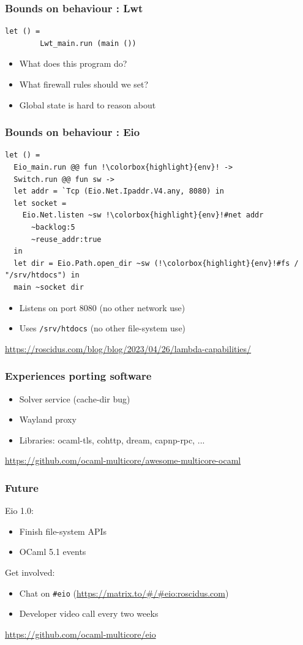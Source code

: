 \documentclass{beamer}
\begin{document}
\begin{frame}[fragile]
	\frametitle{Bounds on behaviour : Lwt}

	\begin{lstlisting}[style=ocaml]
	      let () =
		Lwt_main.run (main ())
	\end{lstlisting}

	\begin{itemize}
		\item What does this program do?
		\item What firewall rules should we set?
		\item Global state is hard to reason about
	\end{itemize}
\end{frame}

\begin{frame}[fragile]
	\frametitle{Bounds on behaviour : Eio}

	\setlength\fboxsep{1.2pt}
	\begin{lstlisting}[style=ocaml,escapechar=!]
let () =
  Eio_main.run @@ fun !\colorbox{highlight}{env}! ->
  Switch.run @@ fun sw ->
  let addr = `Tcp (Eio.Net.Ipaddr.V4.any, 8080) in
  let socket =
    Eio.Net.listen ~sw !\colorbox{highlight}{env}!#net addr
      ~backlog:5
      ~reuse_addr:true
  in
  let dir = Eio.Path.open_dir ~sw (!\colorbox{highlight}{env}!#fs / "/srv/htdocs") in
  main ~socket dir
	\end{lstlisting}
	\begin{itemize}
                \item Listens on port 8080 (no other network use)
                \item Uses \verb|/srv/htdocs| (no other file-system use)
	\end{itemize}
	\bigskip
	\url{https://roscidus.com/blog/blog/2023/04/26/lambda-capabilities/}
\end{frame}

\begin{frame}
	\frametitle{Experiences porting software}
	\begin{itemize}
		\item Solver service (cache-dir bug)
		\item Wayland proxy
		\item Libraries: ocaml-tls, cohttp, dream, capnp-rpc, ...
	\end{itemize}
	\bigskip
	\url{https://github.com/ocaml-multicore/awesome-multicore-ocaml}
\end{frame}

\begin{frame}[fragile]
	\frametitle{Future}
	Eio 1.0:
	\begin{itemize}
		\item Finish file-system APIs
		\item OCaml 5.1 events
	\end{itemize}
	\bigskip
	Get involved:
	\begin{itemize}
		\item Chat on \verb|#eio| (\url{https://matrix.to/#/#eio:roscidus.com})
		\item Developer video call every two weeks
	\end{itemize}
	\bigskip
	\url{https://github.com/ocaml-multicore/eio}
\end{frame}
\end{document}
